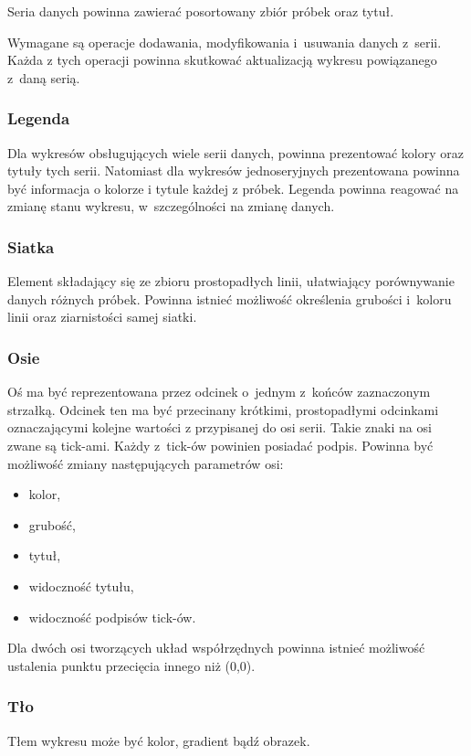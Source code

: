 \documentclass[11pt,twoside,a4paper,final]{article}
\begin{document}
Seria danych powinna zawierać posortowany zbiór próbek oraz tytuł.

Wymagane są operacje dodawania, modyfikowania i~usuwania danych z~serii. Każda z tych operacji powinna skutkować aktualizacją wykresu powiązanego z~daną serią.
  
\subsubsection{Legenda}
Dla wykresów obsługujących wiele serii danych, powinna prezentować kolory oraz tytuły tych serii.
Natomiast dla wykresów jednoseryjnych prezentowana powinna być informacja o kolorze i tytule każdej z próbek. Legenda powinna reagować na zmianę stanu wykresu, w~szczególności na zmianę danych.

\subsubsection{Siatka}
Element składający się ze zbioru prostopadłych linii, ułatwiający porównywanie danych różnych próbek. Powinna istnieć możliwość określenia grubości i~koloru linii oraz ziarnistości samej siatki.

\subsubsection{Osie}
Oś ma być reprezentowana przez odcinek o~jednym z~końców zaznaczonym strzałką. Odcinek ten ma być przecinany krótkimi, prostopadłymi odcinkami oznaczającymi kolejne wartości z przypisanej do osi serii. Takie znaki na osi zwane są tick-ami. Każdy z~tick-ów powinien posiadać podpis.
Powinna być możliwość zmiany następujących parametrów osi:
\begin{itemize}
\item{kolor,}
\item{grubość,}
\item{tytuł,}
\item{widoczność tytułu,}
\item{widoczność podpisów tick-ów.}
\end{itemize}

Dla dwóch osi tworzących układ współrzędnych powinna istnieć możliwość ustalenia punktu przecięcia innego niż (0,0). 

\subsubsection{Tło}
Tłem wykresu może być kolor, gradient bądź obrazek.
\end{document}
